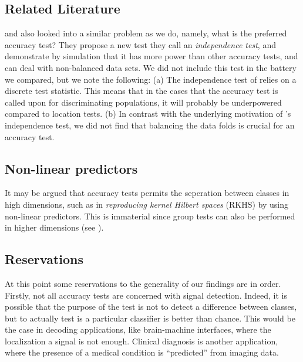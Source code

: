 \documentclass[12pt,a4paper]{article}
\begin{document}
\subsection{Related Literature}
\cite{olivetti_induction_2012} and \cite{olivetti_statistical_2014} also looked into a similar problem as we do, namely, what is the preferred accuracy test?
They propose a new test they call an \emph{independence test}, and demonstrate by simulation that it has more power than other accuracy tests, and can deal with non-balanced data sets. 
We did not include this test in the battery we compared, but we note the following: 
(a) The independence test of \cite{olivetti_induction_2012} relies on a discrete test statistic. This means that in the cases that the accuracy test is called upon for discriminating populations, it will probably be underpowered compared to location tests. 
(b) In contrast with the underlying motivation of \cite{olivetti_induction_2012}'s independence test, we did not find that balancing the data folds is crucial for an accuracy test. 



\subsection{Non-linear predictors}
It may be argued that accuracy tests permits the seperation between classes in high dimensions, such as in \emph{reproducing kernel Hilbert spaces} (RKHS) by using non-linear predictors.
This is immaterial since group tests can also be performed in higher dimensions (see \cite{gretton_kernel_2012-1}).


\subsection{Reservations}
\label{sec:reservations}

At this point some reservations to the generality of our findings are in order. 
Firstly, not all accuracy tests are concerned with signal detection.
Indeed, it is possible that the purpose of the test is not to detect a difference between classes, but to actually test is a particular classifier is better than chance. 
This would be the case in decoding applications, like brain-machine interfaces, where the localization a signal is not enough. 
Clinical diagnosis is another application, where the presence of a medical condition is ``predicted'' from imaging data. \citep[e.g.][]{olivetti_induction_2012,wager_fmri-based_2013}
\end{document}
